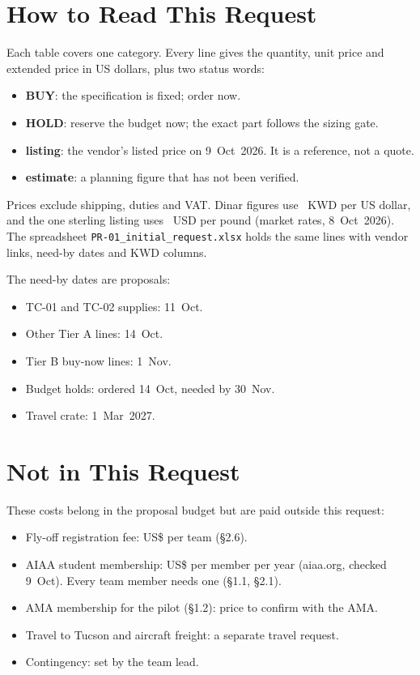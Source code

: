 \documentclass[final]{dbfdoc}
\begin{document}
\section{How to Read This Request}
Each table covers one category. Every line gives the quantity, unit price and extended price in US dollars, plus two status words:
\begin{itemize}
\item \textbf{BUY}: the specification is fixed; order now.
\item \textbf{HOLD}: reserve the budget now; the exact part follows the sizing gate.
\item \textbf{listing}: the vendor's listed price on 9~Oct~2026. It is a reference, not a quote.
\item \textbf{estimate}: a planning figure that has not been verified.
\end{itemize}
Prices exclude shipping, duties and VAT. Dinar figures use \prRateKWD{}~KWD per US dollar, and the one sterling listing uses \prRateGBP{}~USD per pound (market rates, 8~Oct~2026). The spreadsheet \texttt{PR-01\_initial\_request.xlsx} holds the same lines with vendor links, need-by dates and KWD columns.

The need-by dates are proposals:
\begin{itemize}
\item TC-01 and TC-02 supplies: 11~Oct.
\item Other Tier A lines: 14~Oct.
\item Tier B buy-now lines: 1~Nov.
\item Budget holds: ordered 14~Oct, needed by 30~Nov.
\item Travel crate: 1~Mar~2027.
\end{itemize}

\section{Not in This Request}
These costs belong in the proposal budget but are paid outside this request:
\begin{itemize}
\item Fly-off registration fee: US\$\prFee{} per team (§2.6).
\item AIAA student membership: US\$\prAIAA{} per member per year (aiaa.org, checked 9~Oct). Every team member needs one (§1.1, §2.1).
\item AMA membership for the pilot (§1.2): price to confirm with the AMA.
\item Travel to Tucson and aircraft freight: a separate travel request.
\item Contingency: set by the team lead.
\end{itemize}
\end{document}
